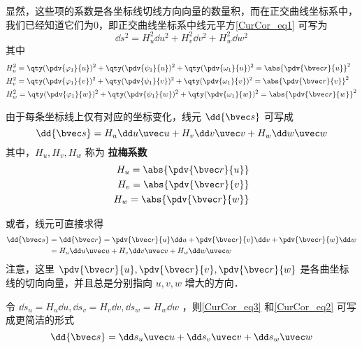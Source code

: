 显然，这些项的系数是各坐标线切线方向向量的数量积，而在正交曲线坐标系中，我们已经知道它们为0，即正交曲线坐标系中线元平方\autoref{CurCor_eq1} 可写为
\begin{equation}
\dd s^2=H_u^2\dd u^2+H_v^2\dd v^2+H_w^2\dd w^2
\end{equation}
其中
\begin{equation}
\begin{aligned}
&H_u^2=\qty(\pdv{\varphi_1}{u})^2+\qty(\pdv{\psi_1}{u})^2+\qty(\pdv{\omega_1}{u})^2=\abs{\pdv{\bvec r}{u}}^2\\
&H_v^2=\qty(\pdv{\varphi_1}{v})^2+\qty(\pdv{\psi_1}{v})^2+\qty(\pdv{\omega_1}{v})^2=\abs{\pdv{\bvec r}{v}}^2\\
&H_w^2=\qty(\pdv{\varphi_1}{w})^2+\qty(\pdv{\psi_1}{w})^2+\qty(\pdv{\omega_1}{w})^2=\abs{\pdv{\bvec r}{w}}^2
\end{aligned}
\end{equation}

由于每条坐标线上仅有对应的坐标变化，线元 $\dd {\bvec s}$ 可写成
\begin{equation}\label{CurCor_eq3}
\dd {\bvec s}=H_u\dd u\uvec u+H_v\dd v\uvec v+H_w\dd w\uvec w
\end{equation}
其中，$H_u,H_v,H_w$ 称为 \textbf{拉梅系数}
\begin{equation}
\begin{aligned}
H_u=\abs{\pdv{\bvec r}{u}}\\
H_v=\abs{\pdv{\bvec r}{v}}\\
H_w=\abs{\pdv{\bvec r}{w}}
\end{aligned}
\end{equation}

或者，线元可直接求得
\begin{equation}\label{CurCor_eq2}
\begin{aligned}
\dd {\bvec s}&=\dd {\bvec r}=\pdv{\bvec r}{u}\dd u+\pdv{\bvec r}{v}\dd v+\pdv{\bvec r}{w}\dd w\\
&=H_u\dd u\uvec u+H_v\dd v\uvec v+H_w\dd w\uvec w
\end{aligned}
\end{equation}
注意，这里 $\pdv{\bvec r}{u},\pdv{\bvec r}{v},\pdv{\bvec r}{w}$ 是各曲坐标线的切向向量，并且总是分别指向 $u,v,w$ 增大的方向．

令 $\dd s_u=H_u\dd u,\dd s_v=H_v\dd v,\dd s_w=H_w\dd w$ ，则\autoref{CurCor_eq3} 和\autoref{CurCor_eq2} 可写成更简洁的形式
\begin{equation}
\dd {\bvec s}=\dd s_u\uvec u+\dd s_v\uvec v+\dd s_w\uvec w
\end{equation}

